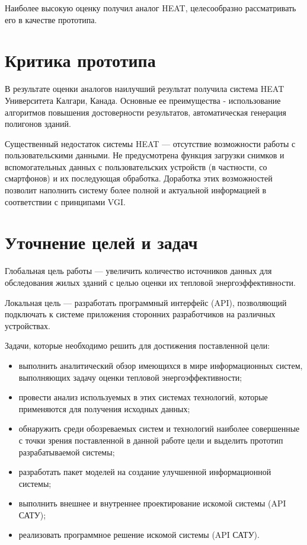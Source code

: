	Наиболее высокую оценку получил аналог HEAT, целесообразно рассматривать его в качестве прототипа.

\section{Критика прототипа}

\par
	В результате оценки аналогов наилучший результат получила система HEAT Университета Калгари, Канада. Основные ее преимущества - использование алгоритмов повышения достоверности результатов, автоматическая генерация полигонов зданий.
	
	Существенный недостаток системы HEAT --- отсутствие возможности работы с пользовательскими данными. Не предусмотрена функция загрузки снимков и вспомогательных данных с пользовательских устройств (в частности, со смартфонов) и их последующая обработка. Доработка этих возможностей позволит наполнить систему более полной и актуальной информацией в соответствии с принципами {VGI}. 

\section{Уточнение целей и задач}

\par

	Глобальная цель работы --- увеличить количество источников данных для обследования жилых зданий с целью оценки их тепловой энергоэффективности.

	Локальная цель --- разработать программный интерфейс ({API}), позволяющий подключать к системе приложения сторонних разработчиков на различных устройствах.

	Задачи, которые необходимо решить для достижения поставленной цели:

	\begin{itemize}
		\item выполнить аналитический обзор имеющихся в мире информационных систем, выполняющих задачу оценки тепловой энергоэффективности;
		\item провести анализ используемых в этих системах технологий, которые применяются для получения исходных данных;
		\item обнаружить среди обозреваемых систем и технологий наиболее совершенные с точки зрения поставленной в данной работе цели и выделить прототип разрабатываемой системы;
		\item разработать пакет моделей на создание улучшенной информационной системы;
		\item выполнить внешнее и внутреннее проектирование искомой системы (API САТУ);
		\item реализовать программное решение искомой системы (API САТУ).
	\end{itemize}


